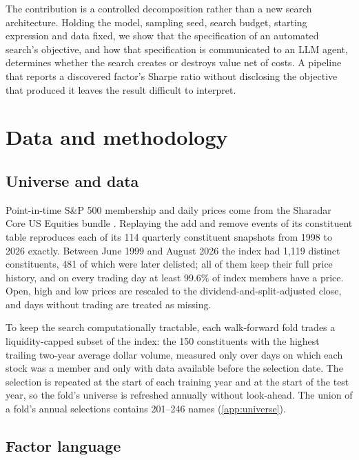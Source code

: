 \documentclass[preprint,12pt,authoryear]{elsarticle}
\begin{document}
The contribution is a controlled decomposition rather than a new search architecture. Holding the model, sampling seed, search budget, starting expression and data fixed, we show that the specification of an automated search's objective, and how that specification is communicated to an LLM agent, determines whether the search creates or destroys value net of costs. A pipeline that reports a discovered factor's Sharpe ratio without disclosing the objective that produced it leaves the result difficult to interpret.

\section{Data and methodology}\label{sec:method}

\subsection{Universe and data}\label{sec:data}

Point-in-time S\&P 500 membership and daily prices come from the Sharadar Core US Equities bundle \citep{sharadar2026}. Replaying the add and remove events of its constituent table reproduces each of its 114 quarterly constituent snapshots from 1998 to 2026 exactly. Between June 1999 and August 2026 the index had 1,119 distinct constituents, 481 of which were later delisted; all of them keep their full price history, and on every trading day at least 99.6\% of index members have a price. Open, high and low prices are rescaled to the dividend-and-split-adjusted close, and days without trading are treated as missing.

To keep the search computationally tractable, each walk-forward fold trades a liquidity-capped subset of the index: the 150 constituents with the highest trailing two-year average dollar volume, measured only over days on which each stock was a member and only with data available before the selection date. The selection is repeated at the start of each training year and at the start of the test year, so the fold's universe is refreshed annually without look-ahead. The union of a fold's annual selections contains 201--246 names (\ref{app:universe}).

\subsection{Factor language}\label{sec:language}
\end{document}
